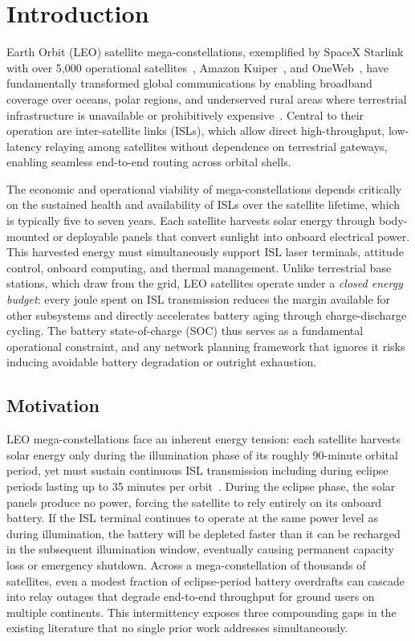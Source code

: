 \documentclass[journal]{IEEEtran}
\begin{document}
\section{Introduction}
\label{sec:intro}

 Earth Orbit (LEO) satellite
mega-constellations, exemplified by SpaceX Starlink with over 5{,}000 operational satellites~\cite{satflow}, Amazon Kuiper~\cite{satflow}, and OneWeb~\cite{satflow}, have fundamentally transformed global communications by enabling broadband coverage over oceans, polar regions, and underserved rural areas where terrestrial infrastructure is unavailable or prohibitively expensive~\cite{kodheli2020survey}. Central to their operation are inter-satellite links (ISLs), which allow direct high-throughput, low-latency relaying among satellites without dependence on terrestrial gateways, enabling seamless end-to-end routing across orbital shells.

The economic and operational viability of mega-constellations depends critically on the sustained health and availability of ISLs over the satellite lifetime, which is typically five to seven years. Each satellite harvests solar energy through body-mounted or deployable panels that convert sunlight into onboard electrical power. This harvested energy must simultaneously support ISL laser terminals, attitude control, onboard computing, and thermal management. Unlike terrestrial base stations, which draw from the grid, LEO satellites operate under a \emph{closed energy budget}: every joule spent on ISL transmission reduces the margin available for other subsystems and directly accelerates battery aging through charge-discharge cycling. The battery state-of-charge (SOC) thus serves as a fundamental operational constraint, and any network planning framework that ignores it risks inducing avoidable battery degradation or outright exhaustion.

\subsection{Motivation}
LEO mega-constellations face an inherent energy tension: each satellite harvests solar energy only during the illumination phase of its roughly 90-minute orbital period, yet must sustain continuous ISL transmission including during eclipse periods lasting up to 35 minutes per orbit~\cite{kodheli2020survey}. During the eclipse phase, the solar panels produce no power, forcing the satellite to rely entirely on its onboard battery. If the ISL terminal continues to operate at the same power level as during illumination, the battery will be depleted faster than it can be recharged in the subsequent illumination window, eventually causing permanent capacity loss or emergency shutdown. Across a mega-constellation of thousands of satellites, even a modest fraction of eclipse-period battery overdrafts can cascade into relay outages that degrade end-to-end throughput for ground users on multiple continents. This intermittency exposes three compounding gaps in the existing literature that no single prior work addresses simultaneously.
\end{document}
